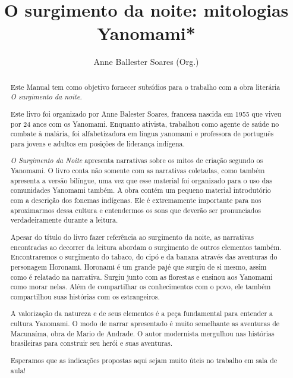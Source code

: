 \documentclass[12pt]{extarticle}
\begin{document}
\newcommand{\AutorLivro}{Anne Ballester Soares (Org.)}
\newcommand{\TituloLivro}{O surgimento da noite: mitologias Yanomami*}
\newcommand{\Tema}{Ficção, mistério e fantasia}
\newcommand{\Genero}{Mitologia indígena}
\newcommand{\imagemCapa}{./images/PNLD0029-01.png}
\newcommand{\issnppub}{---}
\newcommand{\issnepub}{---}
\newcommand{\colaborador}{\textbf{Alessandra Cabral, Vicente Castro e Bruno Gradella} Sofia Boldrini (edição)}


\title{\TituloLivro}
\author{\AutorLivro}
\def\authornotes{\colaborador}

\date{}
\maketitle




\begin{abstract}
Este Manual tem como objetivo fornecer subsídios para o trabalho com a
obra literária \emph{O surgimento da noite.}

Este livro foi organizado por Anne Balester Soares, francesa nascida em 1955 
que viveu por 24 anos com os Yanomami.  Enquanto ativista, trabalhou como agente 
de saúde no combate à malária, foi alfabetizadora em língua yanomami e professora 
de português para jovens e adultos em posições de liderança indígena.

\emph{O Surgimento da Noite} apresenta narrativas sobre os mitos de criação segundo 
os Yanomami. O livro conta não somente com as narrativas coletadas, como também 
apresenta a versão bilíngue, uma vez que esse material foi organizado para o uso 
das comunidades Yanomami também. A obra contém um pequeno material introdutório 
com a descrição dos fonemas indígenas. Ele é extremamente importante para nos 
aproximarmos dessa cultura e entendermos os sons que deverão ser pronunciados 
verdadeiramente durante a leitura. 

Apesar do título do livro fazer referência ao surgimento da noite, as narrativas
encontradas ao decorrer da leitura abordam o surgimento de outros elementos
também. Encontraremos o surgimento do tabaco, do cipó e da banana através
das aventuras do personagem Horonamɨ. Horonamɨ é um grande pajé que surgiu de si mesmo, 
assim como é relatado na narrativa. Surgiu junto com as florestas e ensinou aos Yanomami 
como morar nelas. Além de compartilhar os conhecimentos com o povo, ele também
compartilhou suas histórias com os estrangeiros.

A valorização da natureza e de seus elementos é a peça fundamental para entender 
a cultura Yanomami. O modo de narrar apresentado é muito semelhante as aventuras 
de Macunaíma, obra de Mario de Andrade. O autor modernista mergulhou nas histórias 
brasileiras para construir seu herói e suas aventuras.

Esperamos que as indicações propostas aqui sejam muito úteis no trabalho em
sala de aula! 


\end{abstract}
\end{document}
